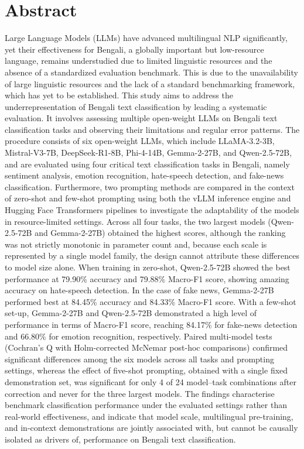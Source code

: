 \documentclass[10pt,letterpaper]{article}
\begin{document}
\section*{Abstract}
Large Language Models (LLMs) have advanced multilingual NLP significantly, yet their effectiveness for Bengali, a globally important but low-resource language, remains understudied due to limited linguistic resources and the absence of a standardized evaluation benchmark. This is due to the unavailability of large linguistic resources and the lack of a standard benchmarking framework, which has yet to be established. This study aims to address the underrepresentation of Bengali text classification by leading a systematic evaluation. It involves assessing multiple open-weight LLMs on Bengali text classification tasks and observing their limitations and regular error patterns. The procedure consists of six open-weight LLMs, which include LLaMA-3.2-3B, Mistral-V3-7B, DeepSeek-R1-8B, Phi-4-14B, Gemma-2-27B, and Qwen-2.5-72B, and are evaluated using four critical text classification tasks in Bengali, namely sentiment analysis, emotion recognition, hate-speech detection, and fake-news classification. Furthermore, two prompting methods are compared in the context of zero-shot and few-shot prompting using both the vLLM inference engine and Hugging Face Transformers pipelines to investigate the adaptability of the models in resource-limited settings. Across all four tasks, the two largest models (Qwen-2.5-72B and Gemma-2-27B) obtained the highest scores, although the ranking was not strictly monotonic in parameter count and, because each scale is represented by a single model family, the design cannot attribute these differences to model size alone. When training in zero-shot, Qwen-2.5-72B showed the best performance at 79.90\% accuracy and 79.88\% Macro-F1 score, showing amazing accuracy on hate-speech detection. In the case of fake news, Gemma-2-27B performed best at 84.45\% accuracy and 84.33\% Macro-F1 score. With a few-shot set-up, Gemma-2-27B and Qwen-2.5-72B demonstrated a high level of performance in terms of Macro-F1 score, reaching 84.17\% for fake-news detection and 66.80\% for emotion recognition, respectively. Paired multi-model tests (Cochran's Q with Holm-corrected McNemar post-hoc comparisons) confirmed significant differences among the six models across all tasks and prompting settings, whereas the effect of five-shot prompting, obtained with a single fixed demonstration set, was significant for only 4 of 24 model--task combinations after correction and never for the three largest models. The findings characterise benchmark classification performance under the evaluated settings rather than real-world effectiveness, and indicate that model scale, multilingual pre-training, and in-context demonstrations are jointly associated with, but cannot be causally isolated as drivers of, performance on Bengali text classification.
\end{document}
